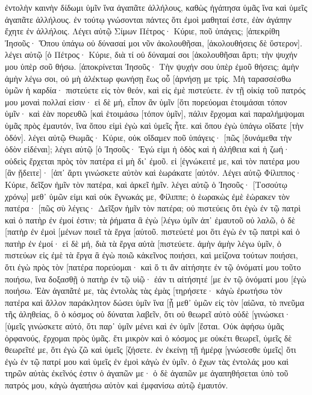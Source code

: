 ἐντολὴν καινὴν δίδωμι ὑμῖν ἵνα ἀγαπᾶτε ἀλλήλους, καθὼς ἠγάπησα ὑμᾶς ἵνα καὶ ὑμεῖς ἀγαπᾶτε ἀλλήλους. 
ἐν τούτῳ γνώσονται πάντες ὅτι ἐμοὶ μαθηταί ἐστε, ἐὰν ἀγάπην ἔχητε ἐν ἀλλήλοις. 
Λέγει αὐτῷ Σίμων Πέτρος· Κύριε, ποῦ ὑπάγεις; [ἀπεκρίθη Ἰησοῦς· Ὅπου ὑπάγω οὐ δύνασαί μοι νῦν ἀκολουθῆσαι, [ἀκολουθήσεις δὲ ὕστερον]. 
λέγει αὐτῷ [ὁ Πέτρος· Κύριε, διὰ τί οὐ δύναμαί σοι [ἀκολουθῆσαι ἄρτι; τὴν ψυχήν μου ὑπὲρ σοῦ θήσω. 
[ἀποκρίνεται Ἰησοῦς· Τὴν ψυχήν σου ὑπὲρ ἐμοῦ θήσεις; ἀμὴν ἀμὴν λέγω σοι, οὐ μὴ ἀλέκτωρ φωνήσῃ ἕως οὗ [ἀρνήσῃ με τρίς. 
Μὴ ταρασσέσθω ὑμῶν ἡ καρδία· πιστεύετε εἰς τὸν θεόν, καὶ εἰς ἐμὲ πιστεύετε. 
ἐν τῇ οἰκίᾳ τοῦ πατρός μου μοναὶ πολλαί εἰσιν· εἰ δὲ μή, εἶπον ἂν ὑμῖν [ὅτι πορεύομαι ἑτοιμάσαι τόπον ὑμῖν· 
καὶ ἐὰν πορευθῶ [καὶ ἑτοιμάσω [τόπον ὑμῖν], πάλιν ἔρχομαι καὶ παραλήμψομαι ὑμᾶς πρὸς ἐμαυτόν, ἵνα ὅπου εἰμὶ ἐγὼ καὶ ὑμεῖς ἦτε. 
καὶ ὅπου ἐγὼ ὑπάγω οἴδατε [τὴν ὁδόν]. 
λέγει αὐτῷ Θωμᾶς· Κύριε, οὐκ οἴδαμεν ποῦ ὑπάγεις· [πῶς [δυνάμεθα τὴν ὁδὸν εἰδέναι]; 
λέγει αὐτῷ [ὁ Ἰησοῦς· Ἐγώ εἰμι ἡ ὁδὸς καὶ ἡ ἀλήθεια καὶ ἡ ζωή· οὐδεὶς ἔρχεται πρὸς τὸν πατέρα εἰ μὴ δι᾽ ἐμοῦ. 
εἰ [ἐγνώκειτέ με, καὶ τὸν πατέρα μου [ἂν ᾔδειτε]· [ἀπ᾽ ἄρτι γινώσκετε αὐτὸν καὶ ἑωράκατε [αὐτόν. 
Λέγει αὐτῷ Φίλιππος· Κύριε, δεῖξον ἡμῖν τὸν πατέρα, καὶ ἀρκεῖ ἡμῖν. 
λέγει αὐτῷ ὁ Ἰησοῦς· [Τοσούτῳ χρόνῳ] μεθ᾽ ὑμῶν εἰμι καὶ οὐκ ἔγνωκάς με, Φίλιππε; ὁ ἑωρακὼς ἐμὲ ἑώρακεν τὸν πατέρα· [πῶς σὺ λέγεις· Δεῖξον ἡμῖν τὸν πατέρα; 
οὐ πιστεύεις ὅτι ἐγὼ ἐν τῷ πατρὶ καὶ ὁ πατὴρ ἐν ἐμοί ἐστιν; τὰ ῥήματα ἃ ἐγὼ [λέγω ὑμῖν ἀπ᾽ ἐμαυτοῦ οὐ λαλῶ, ὁ δὲ [πατὴρ ἐν ἐμοὶ [μένων ποιεῖ τὰ ἔργα [αὐτοῦ. 
πιστεύετέ μοι ὅτι ἐγὼ ἐν τῷ πατρὶ καὶ ὁ πατὴρ ἐν ἐμοί· εἰ δὲ μή, διὰ τὰ ἔργα αὐτὰ [πιστεύετε. 
ἀμὴν ἀμὴν λέγω ὑμῖν, ὁ πιστεύων εἰς ἐμὲ τὰ ἔργα ἃ ἐγὼ ποιῶ κἀκεῖνος ποιήσει, καὶ μείζονα τούτων ποιήσει, ὅτι ἐγὼ πρὸς τὸν [πατέρα πορεύομαι· 
καὶ ὅ τι ἂν αἰτήσητε ἐν τῷ ὀνόματί μου τοῦτο ποιήσω, ἵνα δοξασθῇ ὁ πατὴρ ἐν τῷ υἱῷ· 
ἐάν τι αἰτήσητέ [με ἐν τῷ ὀνόματί μου [ἐγὼ ποιήσω. 
Ἐὰν ἀγαπᾶτέ με, τὰς ἐντολὰς τὰς ἐμὰς [τηρήσετε· 
κἀγὼ ἐρωτήσω τὸν πατέρα καὶ ἄλλον παράκλητον δώσει ὑμῖν ἵνα [ᾖ μεθ᾽ ὑμῶν εἰς τὸν [αἰῶνα, 
τὸ πνεῦμα τῆς ἀληθείας, ὃ ὁ κόσμος οὐ δύναται λαβεῖν, ὅτι οὐ θεωρεῖ αὐτὸ οὐδὲ [γινώσκει· [ὑμεῖς γινώσκετε αὐτό, ὅτι παρ᾽ ὑμῖν μένει καὶ ἐν ὑμῖν [ἔσται. 
Οὐκ ἀφήσω ὑμᾶς ὀρφανούς, ἔρχομαι πρὸς ὑμᾶς. 
ἔτι μικρὸν καὶ ὁ κόσμος με οὐκέτι θεωρεῖ, ὑμεῖς δὲ θεωρεῖτέ με, ὅτι ἐγὼ ζῶ καὶ ὑμεῖς [ζήσετε. 
ἐν ἐκείνῃ τῇ ἡμέρᾳ [γνώσεσθε ὑμεῖς] ὅτι ἐγὼ ἐν τῷ πατρί μου καὶ ὑμεῖς ἐν ἐμοὶ κἀγὼ ἐν ὑμῖν. 
ὁ ἔχων τὰς ἐντολάς μου καὶ τηρῶν αὐτὰς ἐκεῖνός ἐστιν ὁ ἀγαπῶν με· ὁ δὲ ἀγαπῶν με ἀγαπηθήσεται ὑπὸ τοῦ πατρός μου, κἀγὼ ἀγαπήσω αὐτὸν καὶ ἐμφανίσω αὐτῷ ἐμαυτόν. 
